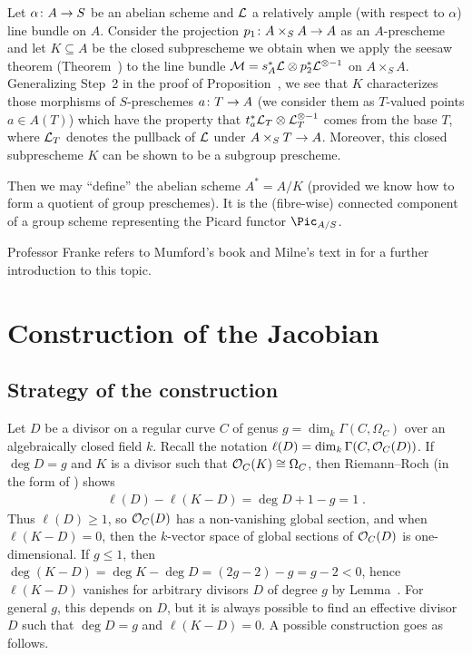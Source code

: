 \documentclass[a4paper,parskip=half,numbers=enddot, DIV=12]{scrreprt}
\renewcommand{\geq}{\geqslant}
\renewcommand{\leq}{\leqslant}
\begin{document}
\begin{rem}
	Let $\alpha\colon A\morphism S$ be an abelian scheme and $\mathcal{L}$ a relatively ample (with respect to $\alpha$) line bundle on $A$. Consider the projection $p_1\colon A\times_SA\morphism A$ as an $A$-prescheme and let $K\subseteq A$ be the closed subprescheme we obtain when we apply the seesaw theorem (Theorem~) to the line bundle $\mathcal{M}=s_A^*\mathcal{L}\otimes p_2^*\mathcal{L}^{\otimes -1}$ on $A\times_SA$. Generalizing Step~2 in the proof of Proposition~, we see that $K$ characterizes those morphisms of $S$-preschemes $a\colon T\morphism A$ (we consider them as $T$-valued points $a\in A(T)$) which have the property that $t_a^*\mathcal{L}_T\otimes \mathcal{L}_T^{\otimes -1}$ comes from the base $T$, where $\mathcal{L}_T$ denotes the pullback of $\mathcal{L}$ under $A\times_ST\morphism A$. Moreover, this closed subprescheme $K$ can be shown to be a subgroup prescheme.
	
	Then we may ``define'' the  abelian scheme $A^*=A/K$ (provided we know how to form a quotient of group preschemes). It is the (fibre-wise) connected component of a group scheme representing the Picard functor $\Pic_{A/S}$.
	
	Professor Franke refers to Mumford's book \cite{mumford1974abelian} and Milne's text in \cite{cornell1986arithmetic} for a further introduction to this topic.
\end{rem}


\chapter{Construction of the Jacobian}
\setcounter{section}{-1}
\section{Strategy of the construction}
Let $D$ be a divisor on a regular curve $C$ of genus $g=\dim_k\Gamma(C,\Omega_C)$ over an algebraically closed field $k$. Recall the notation $\ell(D)=\dim_k\Gamma(C,\mathcal{O}_C(D))$. If $\deg D=g$ and $K$ is a divisor such that $\mathcal{O}_C(K)\cong \Omega_C$, then Riemann--Roch (in the form of \cite[Corollary~3.1.1]{alggeo2}) shows
\begin{align*}
	\ell(D)-\ell(K-D)=\deg D+1-g=1\;.
\end{align*}
Thus $\ell(D)\geq 1$, so $\mathcal{O}_C(D)$ has a non-vanishing global section, and when $\ell(K-D)=0$, then the $k$-vector space of global sections of $\mathcal{O}_C(D)$ is one-dimensional. If $g\leq 1$, then $\deg (K-D)=\deg K-\deg D=(2g-2)-g=g-2<0$, hence $\ell(K-D)$ vanishes for arbitrary divisors $D$ of degree $g$ by Lemma~. For general $g$, this depends on $D$, but it is always possible to find an effective divisor $D$ such that $\deg D=g$ and $\ell(K-D)=0$. A possible construction goes as follows.
\end{document}
